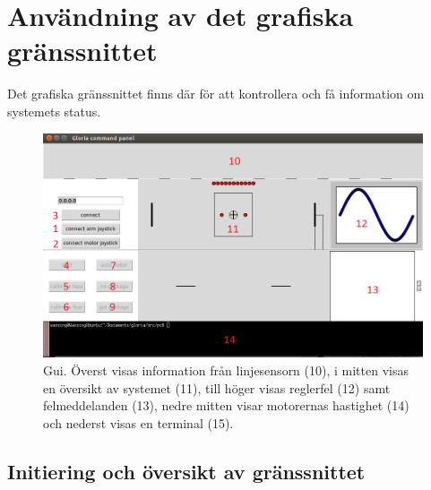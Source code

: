 \section{Användning av det grafiska gränssnittet}

Det grafiska gränssnittet finns där för att kontrollera och få information om systemets status.

\begin{figure}[h!]
	\center
	\includegraphics[scale=0.6]{Gui.png}
	\endcenter
	\caption{Gui. Överst visas information från linjesensorn (10), i mitten visas en översikt av systemet (11), till höger visas reglerfel (12) samt felmeddelanden (13), nedre mitten visar motorernas hastighet (14) och nederst visas en terminal (15).}
\end{figure}

\subsection{Initiering och översikt av gränssnittet}

